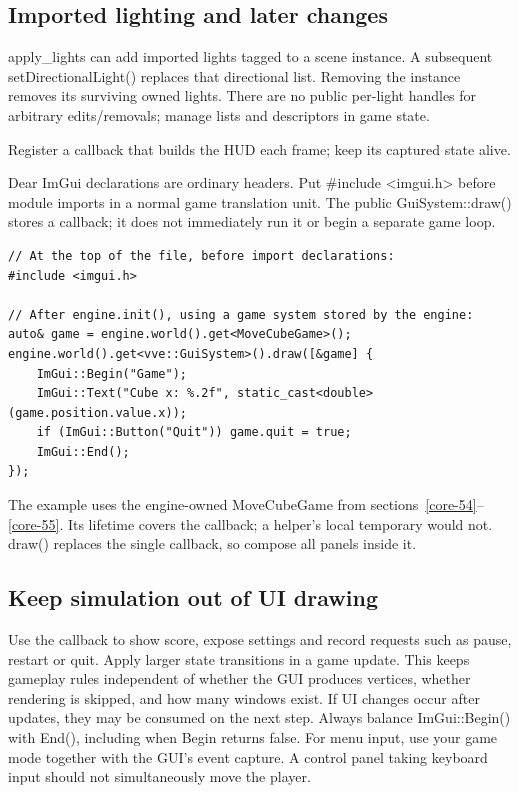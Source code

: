\documentclass[11pt,a4paper]{article}
\begin{document}
\subsection*{Imported lighting and later changes}
apply\_lights can add imported lights tagged to a scene instance. A subsequent setDirectionalLight() replaces that directional list. Removing the instance removes its surviving owned lights. There are no public per-light handles for arbitrary edits/removals; manage lists and descriptors in game state.

\label{core-68}
Register a callback that builds the HUD each frame; keep its captured state alive.

Dear ImGui declarations are ordinary headers. Put \#include <imgui.h> before module imports in a normal game translation unit. The public GuiSystem::draw() stores a callback; it does not immediately run it or begin a separate game loop.

\begin{lstlisting}[language={}]
// At the top of the file, before import declarations:
#include <imgui.h>

// After engine.init(), using a game system stored by the engine:
auto& game = engine.world().get<MoveCubeGame>();
engine.world().get<vve::GuiSystem>().draw([&game] {
    ImGui::Begin("Game");
    ImGui::Text("Cube x: %.2f", static_cast<double>(game.position.value.x));
    if (ImGui::Button("Quit")) game.quit = true;
    ImGui::End();
});
\end{lstlisting}

The example uses the engine-owned MoveCubeGame from sections~\ref{core-54}--\ref{core-55}. Its lifetime covers the callback; a helper's local temporary would not. draw() replaces the single callback, so compose all panels inside it.

\subsection*{Keep simulation out of UI drawing}
Use the callback to show score, expose settings and record requests such as pause, restart or quit. Apply larger state transitions in a game update. This keeps gameplay rules independent of whether the GUI produces vertices, whether rendering is skipped, and how many windows exist. If UI changes occur after updates, they may be consumed on the next step. Always balance ImGui::Begin() with End(), including when Begin returns false. For menu input, use your game mode together with the GUI's event capture. A control panel taking keyboard input should not simultaneously move the player.
\end{document}

